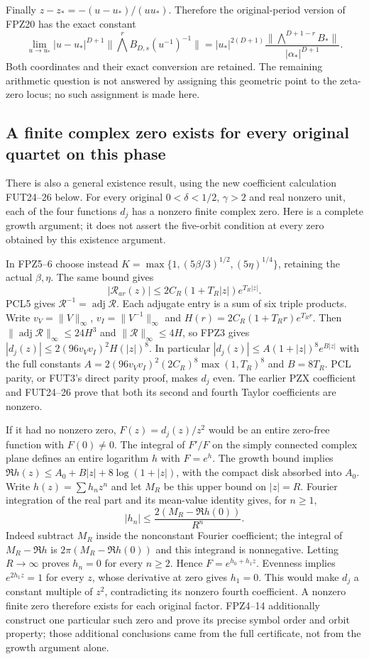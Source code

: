 Finally $z-z_* =-(u-u_*)/(uu_*)$. Therefore the original-period version
of FPZ20 has the exact constant
\[
 \lim_{u\to u_*}|u-u_*|^{D+1}
 \|\bigwedge^r B_{D,s}(u^{-1})^{-1}\|
 =|u_*|^{2(D+1)}
 \frac{\|\bigwedge^{D+1-r}B_*\|}{|\alpha_*|^{D+1}}.
 \tag{FPZ24}
\]
Both coordinates and their exact conversion are retained. The remaining
arithmetic question is not answered by assigning this geometric point
to the zeta-zero locus; no such assignment is made here.

\subsection{A finite complex zero exists for every original quartet on this phase}
There is also a general existence result, using the new coefficient
calculation FUT24--26 below. For every original
$0<\delta<1/2$, $\gamma>2$ and real nonzero unit, each of the four
functions $d_j$ has a nonzero finite complex zero. Here is a complete
growth argument; it does not assert the five-orbit condition at every
zero obtained by this existence argument.

In FPZ5--6 choose instead
$K=\max\{1,(5\beta/3)^{1/2},(5\eta)^{1/4}\}$, retaining the actual
$\beta,\eta$. The same bound gives
\[
 |\mathcal R_{ar}(z)|\le 2C_R(1+T_R|z|)e^{T_R|z|}.
 \tag{FPZ25}
\]
PCL5 gives $\mathcal R^{-1}=\operatorname{adj}\mathcal R$.
Each adjugate entry is a sum of six triple products. Write
$v_V=\|V\|_\infty$, $v_I=\|V^{-1}\|_\infty$ and
$H(r)=2C_R(1+T_Rr)e^{T_Rr}$. Then
$\|\operatorname{adj}\mathcal R\|_\infty\le24H^3$ and
$\|\mathcal R\|_\infty\le4H$, so FPZ3 gives
$|d_j(z)|\le2(96v_Vv_I)^2H(|z|)^8$. In particular
$|d_j(z)|\le A(1+|z|)^8e^{B|z|}$ with the full constants
$A=2(96v_Vv_I)^2(2C_R)^8\max(1,T_R)^8$ and $B=8T_R$.
PCL parity, or FUT3's direct parity proof, makes $d_j$ even.
The earlier PZX coefficient and FUT24--26 prove that both its
second and fourth Taylor coefficients are nonzero.

If it had no nonzero zero, $F(z)=d_j(z)/z^2$ would be an entire
zero-free function with $F(0)\ne0$. The integral of $F'/F$ on the
simply connected complex plane defines an entire logarithm $h$ with
$F=e^h$. The growth bound implies
$\Re h(z)\le A_0+B|z|+8\log(1+|z|)$, with the compact disk
absorbed into $A_0$. Write $h(z)=\sum h_nz^n$ and let $M_R$ be
this upper bound on $|z|=R$. Fourier integration of the real part
and its mean-value identity gives, for $n\ge1$,
\[
 |h_n|\le\frac{2(M_R-\Re h(0))}{R^n}.
 \tag{FPZ26}
\]
Indeed subtract $M_R$ inside the nonconstant Fourier coefficient;
the integral of $M_R-\Re h$ is $2\pi(M_R-\Re h(0))$ and this
integrand is nonnegative. Letting $R\to\infty$ proves $h_n=0$
for every $n\ge2$. Hence $F=e^{h_0+h_1z}$. Evenness implies
$e^{2h_1z}=1$ for every $z$, whose derivative at zero gives
$h_1=0$. This would make $d_j$ a constant multiple of $z^2$,
contradicting its nonzero fourth coefficient. A nonzero finite zero
therefore exists for each original factor. FPZ4--14 additionally
construct one particular such zero and prove its precise symbol order
and orbit property; those additional conclusions came from the full
certificate, not from the growth argument alone.
